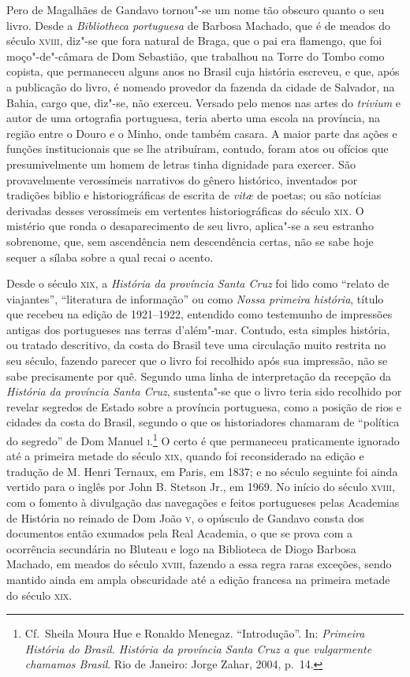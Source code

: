 Pero de Magalhães de Gandavo  tornou"-se um nome tão obscuro quanto o seu
livro. Desde a \textit{Bibliotheca portuguesa} de Barbosa Machado, que é de
meados do século \textsc{xviii}, diz"-se que fora natural de Braga, que o pai era
flamengo, que foi moço"-de"-câmara de Dom Sebastião, que trabalhou na
Torre do Tombo como copista, que permaneceu alguns anos no Brasil cuja
história escreveu, e que, após a publicação do livro, é nomeado
provedor da fazenda da cidade de Salvador, na Bahia, cargo que, diz"-se,
não exerceu. Versado pelo menos nas artes do \textit{trivium} e autor de uma
ortografia portuguesa, teria aberto uma escola na província, na região
entre o Douro e o Minho, onde também casara. A maior parte das ações e
funções institucionais que se lhe atribuíram, contudo, foram atos ou
ofícios que presumivelmente um homem de letras tinha dignidade para
exercer. São provavelmente verossímeis narrativos do gênero histórico,
inventados por tradições biblio e historiográficas de escrita de \textit{vit\ae}
de poetas; ou são notícias derivadas desses verossímeis em vertentes
historiográficas do século \textsc{xix}. O mistério que ronda o desaparecimento
de seu livro, aplica"-se a seu estranho sobrenome, que, sem ascendência
nem descendência certas, não se sabe hoje sequer a sílaba sobre a qual recai o acento.

Desde o século \textsc{xix}, a \textit{História da província Santa Cruz} foi lido como
``relato de viajantes'', ``literatura de informação'' ou como \textit{Nossa
primeira história}, título que recebeu na edição de 1921--1922, entendido
como testemunho de impressões antigas dos portugueses nas terras
d'além"-mar. Contudo, esta simples história, ou tratado
descritivo, da costa do Brasil teve uma circulação muito restrita no
seu século, fazendo parecer que o livro foi recolhido após sua
impressão, não se sabe precisamente por quê. Segundo uma linha de
interpretação da recepção da \textit{História da província Santa Cruz},
sustenta"-se que o livro teria sido recolhido por revelar segredos de
Estado sobre a província portuguesa, como a posição de rios e cidades
da costa do Brasil, segundo o que os historiadores chamaram de
``política do segredo'' de Dom Manuel \textsc{i}.\footnote{ Cf.~Sheila 
Moura Hue e Ronaldo Menegaz.
``Introdução''. In:  \textit{Primeira História do
Brasil. História da província Santa Cruz a que vulgarmente chamamos
Brasil}. Rio de Janeiro: Jorge Zahar, 2004, p.~14.} O certo é que
permaneceu praticamente ignorado até a primeira metade do século \textsc{xix},
quando foi reconsiderado na edição e tradução de M. Henri Ternaux, em
Paris, em 1837; e no século seguinte foi ainda vertido para o inglês
por John B. Stetson Jr., em 1969. No início do século \textsc{xviii}, com o
fomento à divulgação das navegações e feitos portugueses pelas
Academias de História no reinado de Dom João \textsc{v}, o opúsculo de Gandavo
consta dos documentos então exumados pela Real Academia, o que se prova
com a ocorrência secundária no Bluteau e logo na Biblioteca de Diogo
Barbosa Machado, em meados do século \textsc{xviii}, fazendo a essa regra raras
exceções, sendo mantido ainda em ampla obscuridade até a edição
francesa na primeira metade do século \textsc{xix}.

